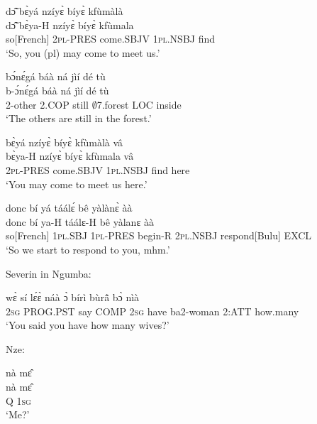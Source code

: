 \begin{exe} 
\exC\label{136}
  \glll  dɔ̃̂ bɛ̀yá nzíyɛ̀ bíyɛ̀ kfùmàlà \\
        dɔ̃̂ bɛ̀ya-H nzíyɛ̀ bíyɛ̀ kfùmala \\
        so[French] 2\textsc{pl}-PRES  come.SBJV 1\textsc{pl}.NSBJ find   \\
    \trans `So, you (pl) may come to meet us.'
\end{exe}

\begin{exe} 
\exC\label{137}
  \glll  bɔ́nɛ́gá báà ná jìí dé tù \\
        b-ɔ́nɛ́gá báà ná jìí dé tù \\
          2-other 2.COP still $\emptyset$7.forest LOC inside  \\
    \trans `The others are still in the forest.'
\end{exe}

\begin{exe} 
\exC\label{138}
  \glll  bɛ̀yá nzíyɛ̀ bíyɛ̀ kfùmàlà vâ \\
         bɛ̀ya-H nzíyɛ̀ bíyɛ̀ kfùmala vâ \\
         2\textsc{pl}-PRES  come.SBJV 1\textsc{pl}.NSBJ find here   \\
    \trans `You may come to meet us here.'
\end{exe}

\begin{exe} 
\exC\label{139} 
  \glll  donc bí yá táálɛ́ bê yàlànɛ̀ àà \\
        donc bí ya-H táálɛ-H bê yàlanɛ àà \\
       so[French] 1\textsc{pl}.SBJ  1\textsc{pl}-PRES begin-R 2\textsc{pl}.NSBJ respond[Bulu] EXCL   \\
    \trans `So we start to respond to you, mhm.'
\end{exe}

\noindent Severin in Ngumba:

\begin{exe} 
\exC\label{140} 
  \gll  wɛ̀ sí lɛ́ɛ̀ náà ɔ̀ bírì bùrã̂ bɔ̀ nìà \\
          2\textsc{sg} PROG.PST say COMP 2\textsc{sg} have ba2-woman 2:ATT how.many  \\
    \trans `You said you have how many wives?'
\end{exe}

\noindent Nze:

\begin{exe} 
\exC\label{141} 
  \glll  nà mɛ̂ \\
         nà mɛ̂ \\
          Q 1\textsc{sg}  \\
    \trans `Me?'
\end{exe}

